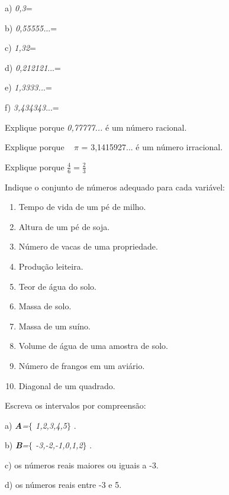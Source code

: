 \begin{exercicios}
\begin{multicols}{3}
a) \textit{0,3}=

b) \textit{0,55555.}..=

c) \textit{1,32}= 

d) \textit{0,212121}...=

e) \textit{1,3333..}.=

f) \textit{3,434343}...=
\end{multicols}

	\exitem{}  Explique porque \textit{0,77777...} é um número racional.

	\exitem{}  Explique porque ~ $ \pi $  = 3,1415927... é um número irracional.

	\exitem{}  Explique porque  \( \frac{4}{6}=\frac{2}{3} \)  ~~ 

	\exitem{}  Indique o conjunto de números adequado para cada variável:
	\begin{enumerate}[label=\alph*)]
    \item Tempo de vida de um pé de milho.

    \item Altura de um pé de soja.

    \item Número de vacas de uma propriedade.

    \item Produção leiteira.

    \item Teor de água do solo.

    \item Massa de solo.

    \item Massa de um suíno.

    \item Volume de água de uma amostra de solo.

    \item Número de frangos em um aviário.

    \item Diagonal de um quadrado.
\end{enumerate}
	\exitem{} Escreva os intervalos por compreensão:
	\begin{multicols}{2}
	
		a) \textbf{\textit{A}}\textit{=$ \{ $ 1,2,3,4,5$ \} $ }.
		
		b) \textbf{\textit{B}}\textit{=$ \{ $ -3,-2,-1,0,1,2$ \} $ }.

		c) os números reais maiores ou iguais a -3.
		
		d) os números reais entre -3 e 5.


\end{multicols}
\end{exercicios}
